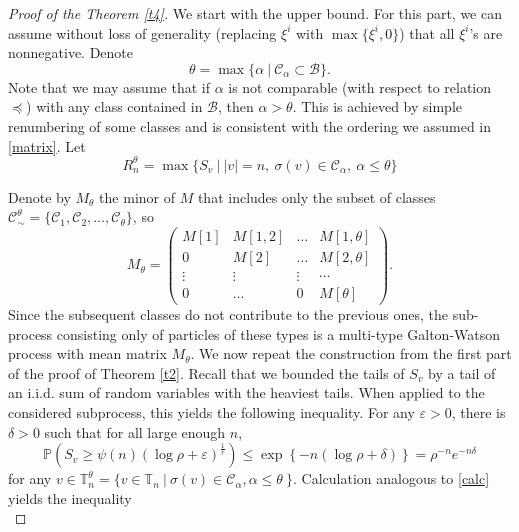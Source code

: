 \documentclass[12pt]{article}
\numberwithin{equation}{section}
\begin{document}
\begin{proof}[Proof of the Theorem \ref{t4}]

We start with the upper bound. For this part, we can assume without loss of generality (replacing $\xi^i$ with $\max\{\xi^i,0\}$) that all $\xi^i$'s are nonnegative. Denote \[\theta = \max \{\alpha \ | \ \mathcal{C}_\alpha \subset \mathcal{B}\}.\] Note that we may assume that if $\alpha$ is not comparable (with respect to relation $\preceq$) with any class contained in $\mathcal{B}$, then $\alpha > \theta$. This is achieved by simple renumbering of some classes and is consistent with the ordering we assumed in \eqref{matrix}. Let \[R^\theta_n = \max \{ S_v \ | \ |v|=n, \ \sigma(v) \in \mathcal{C}_\alpha, \ \alpha \leq \theta\}\]

Denote by $M_\theta$ the minor of $M$ that includes only the subset of classes $\mathcal{C}_{\sim}^\theta = \{\mathcal{C}_1, \mathcal{C}_2, \dots, \mathcal{C}_\theta\}$, so
\begin{equation}\label{matrix2}
    M_\theta = \begin{pmatrix}
        M[1] & M[1,2] & \dots & M[1,\theta] \\
        0 & M[2] & \dots & M[2,\theta]\\
        \vdots & \vdots & \vdots & \cdots \\
        0 & \dots & 0 & M[\theta]
    \end{pmatrix}
    .
\end{equation}
Since the subsequent classes do not contribute to the previous ones, the sub-process consisting only of particles of these types is a multi-type Galton-Watson process with mean matrix $M_\theta$. 
We now repeat the construction from the first part of the proof of Theorem \ref{t2}. Recall that we bounded the tails of $S_v$ by a tail of an i.i.d. sum of random variables with the heaviest tails. When applied to the considered subprocess, this yields the following inequality. For any $\varepsilon > 0$, there is $\delta >0 $ such that for all large enough $n$,
    \begin{equation}
        \mathbb{P}\left(S_v \geq \psi(n) (\log \rho + \varepsilon)^{\frac 1 r}\right) \leq \exp \left\{ -n(\log \rho + \delta) \right\} = \rho^{-n} e^{ -n \delta}
    \end{equation} 
    for any $v \in \mathbb{T}^\theta_n = \{v \in \mathbb{T}_n \ | \ \sigma(v)  \in \mathcal{C}_\alpha, \alpha \leq \theta \ \}$.  
Calculation analogous to \eqref{calc} yields the inequality
\begin{equation}\label{calc2}

\end{equation}
\end{proof}
\end{document}

